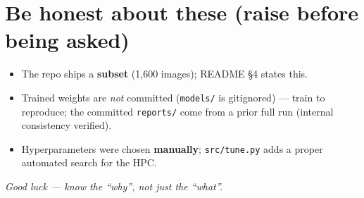 \documentclass[11pt,a4paper]{article}
\newcommand{\code}[1]{\colorbox{codebg}{\small\texttt{#1}}}
\begin{document}
\section{Be honest about these (raise before being asked)}
\begin{itemize}[leftmargin=*,itemsep=1pt]
  \item The repo ships a \textbf{subset} (1{,}600 images); README \S4 states this.
  \item Trained weights are \emph{not} committed (\code{models/} is gitignored) --- train to reproduce; the committed \code{reports/} come from a prior full run (internal consistency verified).
  \item Hyperparameters were chosen \textbf{manually}; \code{src/tune.py} adds a proper automated search for the HPC.
\end{itemize}

\vspace{1em}
\begin{center}\itshape Good luck --- know the ``why'', not just the ``what''.\end{center}
\end{document}
